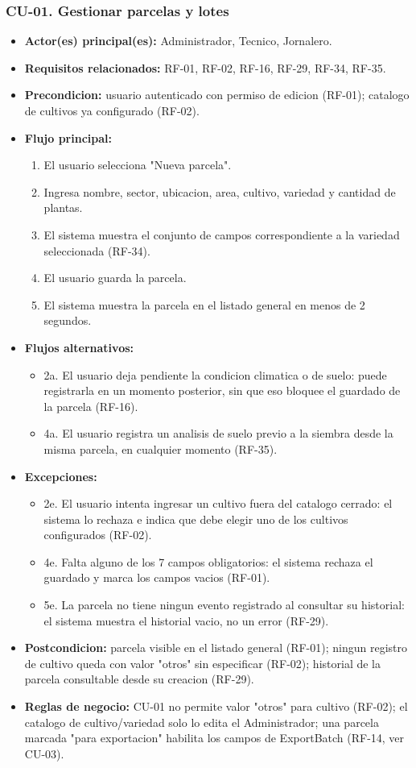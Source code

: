 \documentclass[11pt,a4paper]{article}
\begin{document}
\subsubsection{CU-01. Gestionar parcelas y lotes}
\begin{itemize}
\item \textbf{Actor(es) principal(es):} Administrador, Tecnico, Jornalero.
\item \textbf{Requisitos relacionados:} RF-01, RF-02, RF-16, RF-29, RF-34, RF-35.
\item \textbf{Precondicion:} usuario autenticado con permiso de edicion (RF-01); catalogo de cultivos ya configurado (RF-02).
\item \textbf{Flujo principal:}
  \begin{enumerate}
  \item El usuario selecciona "Nueva parcela".
  \item Ingresa nombre, sector, ubicacion, area, cultivo, variedad y cantidad de plantas.
  \item El sistema muestra el conjunto de campos correspondiente a la variedad seleccionada (RF-34).
  \item El usuario guarda la parcela.
  \item El sistema muestra la parcela en el listado general en menos de 2 segundos.
  \end{enumerate}
\item \textbf{Flujos alternativos:}
  \begin{itemize}
  \item 2a. El usuario deja pendiente la condicion climatica o de suelo: puede registrarla en un momento posterior, sin que eso bloquee el guardado de la parcela (RF-16).
  \item 4a. El usuario registra un analisis de suelo previo a la siembra desde la misma parcela, en cualquier momento (RF-35).
  \end{itemize}
\item \textbf{Excepciones:}
  \begin{itemize}
  \item 2e. El usuario intenta ingresar un cultivo fuera del catalogo cerrado: el sistema lo rechaza e indica que debe elegir uno de los cultivos configurados (RF-02).
  \item 4e. Falta alguno de los 7 campos obligatorios: el sistema rechaza el guardado y marca los campos vacios (RF-01).
  \item 5e. La parcela no tiene ningun evento registrado al consultar su historial: el sistema muestra el historial vacio, no un error (RF-29).
  \end{itemize}
\item \textbf{Postcondicion:} parcela visible en el listado general (RF-01); ningun registro de cultivo queda con valor "otros" sin especificar (RF-02); historial de la parcela consultable desde su creacion (RF-29).
\item \textbf{Reglas de negocio:} CU-01 no permite valor "otros" para cultivo (RF-02); el catalogo de cultivo/variedad solo lo edita el Administrador; una parcela marcada "para exportacion" habilita los campos de ExportBatch (RF-14, ver CU-03).
\end{itemize}
\end{document}
